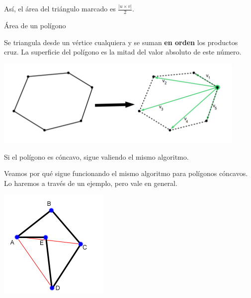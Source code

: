\documentclass[compress]{beamer}
\newcommand{\bigpause}{\bigskip \pause}
\begin{document}
\begin{frame}

As\'i, el \'area del tri\'angulo marcado es $\displaystyle\frac{|u\times v|}{2}$.\bigpause


\bigpause

\end{frame}

\begin{frame}{\'Area de un polígono}

Se triangula desde un v\'ertice cualquiera y se suman \textbf{en orden} 
los productos cruz. La superficie del pol\'igono es la mitad del valor 
absoluto de este n\'umero.

\begin{center}
\includegraphics[scale=0.6]{images/triangulacion.png}
\end{center}

Si el pol\'igono es c\'oncavo, sigue valiendo el mismo algoritmo.
\bigpause

\end{frame}

\begin{frame}
Veamos por qué sigue funcionando el mismo algoritmo para polígonos
cóncavos. Lo haremos a través de un ejemplo, pero vale en general.

\begin{center}
\includegraphics[scale=0.6]{images/area_polygon.png}
\end{center}
\end{frame}
\end{document}
